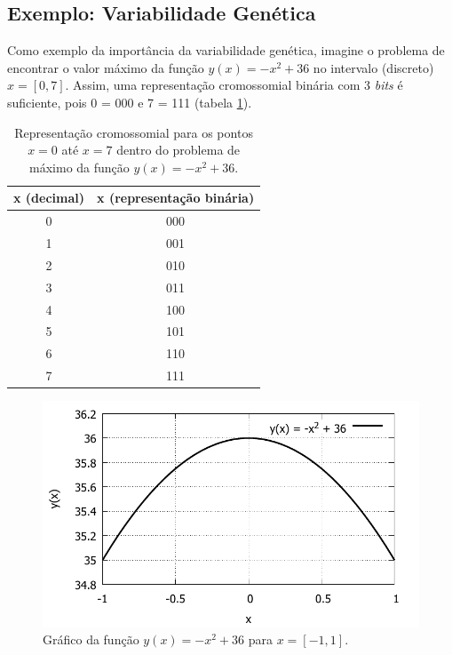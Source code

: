 	\subsection{\label{ExemploVariabilidade}Exemplo: Variabilidade Genética}
	
	Como exemplo da importância da variabilidade genética, imagine o problema de encontrar o valor máximo da função $y(x) = -x^2 + 36$ no intervalo (discreto) $x = [0,7]$. Assim, uma representação cromossomial binária com 3 \textit{bits} é suficiente, pois 0 = 000 e 7 = 111 (tabela \ref{tabRepCroX2}).
	
	\begin{table}[htp]
 		\caption{\label{tabRepCroX2}Representação cromossomial para os pontos $x = 0$ até $x = 7$ dentro do problema de máximo da função $y(x) = -x^2 + 36$.}
 		\begin{center}
  		\begin{tabular}{cc}
   			\hline
   			\textbf{x (decimal)}  & \textbf{x (representação binária)} \\
   			\hline
   			0 & 000 \\
   			1 & 001 \\
   			2 & 010 \\ 
   			3 & 011 \\
   			4 & 100 \\
   			5 & 101 \\ 
   			6 & 110 \\
   			7 & 111	\\
   			\hline
   		\end{tabular}
 		\end{center}
	\end{table}
	
	\begin{figure}[htp]
		\begin{center}
			\includegraphics[width=13cm]{figs/ga/Parabola.pdf}
		\end{center}
		\caption{\label{figParabola}Gráfico da função $y(x) = -x^2 + 36$ para $x = [-1,1]$.}
	\end{figure}
	
